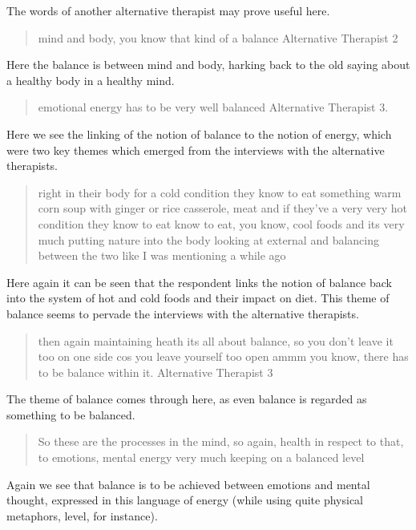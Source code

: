 The words of another alternative therapist may prove useful here. 
\begin{quotation}
  mind and body, you know that kind of a balance 
Alternative Therapist 2
\end{quotation}

Here the balance is between mind and body, harking back to the old saying about a healthy body in a healthy mind. 


\begin{quotation}
  emotional energy has to be very well balanced
Alternative Therapist 3.
\end{quotation}

Here we see the linking of the notion of balance to the notion of energy, which were two key themes which emerged from the interviews with the alternative therapists. 

\begin{quotation}
  right in their body for a cold condition they know to eat something warm corn soup with ginger or rice casserole, meat and if they've a very very hot condition they know to eat know to eat, you know, cool foods and its very much putting nature into the body looking at external and balancing between the two like I was mentioning a while ago

\end{quotation}

Here again it can be seen that the respondent links the notion of balance back into the system of hot and cold foods and their impact on diet. This theme of balance seems to pervade the interviews with the alternative therapists. 

\begin{quotation}
then again maintaining heath its all about balance, so you don't leave it too on one side cos you leave yourself too open ammm you know, there has to be balance within it.
Alternative Therapist 3
\end{quotation}

The theme of balance comes through here, as even balance is regarded as something to be balanced. 


\begin{quotation}
   So these are the processes in the mind, so again, health in respect to that, to emotions, mental energy very much keeping on a balanced level

\end{quotation}

Again we see that balance is to be achieved between emotions and mental thought, expressed in this language of energy (while using quite physical metaphors, level, for instance). 

